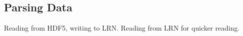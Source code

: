 \subsection{Parsing Data}
\label{sec:preprocessing_parsing}

Reading from HDF5, writing to LRN. Reading from LRN for quicker reading.